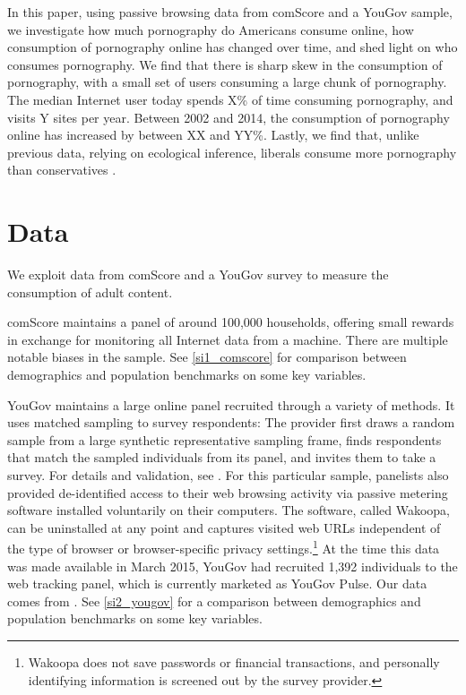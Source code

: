 \documentclass[12pt, letterpaper]{article}
\begin{document}
In this paper, using passive browsing data from comScore and a YouGov sample, we investigate how much pornography do Americans consume online, how consumption of pornography online has changed over time, and shed light on who consumes pornography. We find that there is sharp skew in the consumption of pornography, with a small set of users consuming a large chunk of pornography. The median Internet user today spends X\% of time consuming pornography, and visits Y sites per year. Between 2002 and 2014, the consumption of pornography online has increased by between XX and YY\%. Lastly, we find that, unlike previous data, relying on ecological inference, liberals consume more pornography than conservatives \citep{macinnis2015american, edelman2009markets}. 

\citep{lykke2015widening}
\citep{boik2016empirical}

\section*{Data}
We exploit data from comScore and a YouGov survey to measure the consumption of adult content. 

comScore maintains a panel of around 100,000 households, offering small rewards in exchange for monitoring all Internet data from a machine. There are multiple notable biases in the sample. See \ref{si1_comscore} for comparison between demographics and population benchmarks on some key variables.

YouGov maintains a large online panel recruited through a variety of methods. It uses matched sampling to survey respondents: The provider first draws a random sample from a large synthetic representative sampling frame, finds respondents that match the sampled individuals from its panel, and invites them to take a survey. For details and validation, see \citet{rivers2009}. For this particular sample, panelists also provided de-identified access to their web browsing activity via passive metering software installed voluntarily on their computers. The software, called Wakoopa, can be uninstalled at any point and captures visited web URLs independent of the type of browser or browser-specific privacy settings.\footnote{Wakoopa does not save passwords or financial transactions, and personally identifying information is screened out by the survey provider.} At the time this data was made available in March 2015, YouGov had recruited 1,392 individuals to the web tracking panel, which is currently marketed as YouGov Pulse. Our data comes from \citet{guess2016}. See \ref{si2_yougov} for a comparison between demographics and population benchmarks on some key variables.
\end{document}
